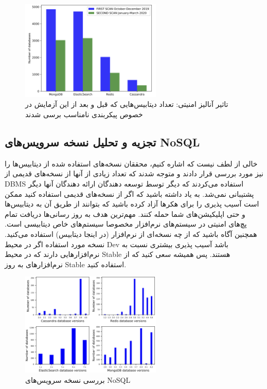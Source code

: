 \documentclass[10pt, a4paper]{article}
\begin{document}
\begin{figure}[H]
    \centering
    \includegraphics[width=0.6\textwidth]{res/fig7.png}
    \caption{تاثیر آنالیز امنیتی: تعداد دیتابیس‌هایی که قبل و بعد از این آزمایش
    در خصوص پیکربندی نامناسب برسی شدند}
    \label{fig: diagram}
\end{figure}

\subsection{تجزیه و تحلیل نسخه سرویس‌های NoSQL}

خالی از لطف نیست که اشاره کنیم، محققان نسخه‌های استفاده شده از دیتابیس‌ها را نیز
مورد بررسی قرار دادند و متوجه شدند که تعداد زیادی از آنها از نسخه‌های قدیمی از
DBMS استفاده می‌کردند که دیگر توسط توسعه دهندگان ارائه دهندگان آنها دیگر
پشتیبانی نمی‌شد. به یاد داشته باشید که اگر از نسخه‌های قدیمی استفاده کنید ممکن
است آسیب پذیری را برای هکر‌ها آزاد کرده باشید که بتوانند از طریق آن به
دیتابیس‌ها و حتی اپلیکیشن‌های شما حمله کنند. مهم‌ترین هدف به روز رسانی‌ها دریافت
تمام پچ‌های امنیتی در سیستم‌های نرم‌افزار مخصوصا سیستم‌های خاص دیتابیسی است.
همچنین آگاه باشید که از چه نسخه‌ای از نرم‌افزار (در اینجا دیتابیس) استفاده
می‌کنید. نسخه مورد استفاده اگر در محیط Dev باشد آسیب پذیری بیشتری نسبت به
نرم‌افزار‌هایی دارند که در محیط Stable هستند. پس همیشه سعی کنید که از
نرم‌افزار‌های به روز Stable استفاده کنید.

\begin{figure}[H]
    \centering
    \includegraphics[width=0.6\textwidth]{res/fig8.png}
    \caption{بررسی نسخه سرویس‌های NoSQL}
    \label{fig: diagram}
\end{figure}
\end{document}
